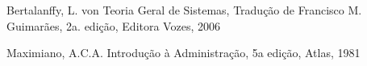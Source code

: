 \documentclass[
12pt,		%
openright,	%
twoside,  %
a4paper,			%
chapter=TITLE,		%
english,			%
french,				%
spanish,			%
brazil				%
]{USPSC-classe/USPSC}
\begin{document}
\begin{flushleft}
\begin{flushleft}
\begin{flushleft}
\begin{flushleft}
\begin{flushleft}
\begin{flushleft}
\begin{flushleft}
\begin{flushleft}
[BERTALANFFY, 1968] Bertalanffy, L. von Teoria Geral de Sistemas, Tradu\c{c}\~ao de Francisco M. Guimar\~aes, 2a. edi\c{c}\~ao, Editora Vozes, 2006
\end{flushleft}


\end{flushleft}


\end{flushleft}


\end{flushleft}


\end{flushleft}


\end{flushleft}


\end{flushleft}


\end{flushleft}


\begin{flushleft}
\begin{flushleft}
\begin{flushleft}
\begin{flushleft}
\begin{flushleft}
\begin{flushleft}
\begin{flushleft}
\begin{flushleft}
[MAXIMIANO, 1981] Maximiano, A.C.A. Introdu\c{c}\~ao \`a Administra\c{c}\~ao, 5a edi\c{c}\~ao, Atlas, 1981
\end{flushleft}


\end{flushleft}


\end{flushleft}


\end{flushleft}


\end{flushleft}


\end{flushleft}


\end{flushleft}


\end{flushleft}
\end{document}
